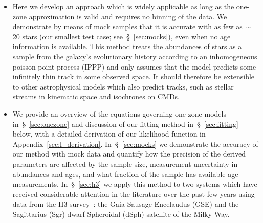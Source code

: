 \documentclass[ms.tex]{subfiles}
\begin{document}
\begin{itemize}
	\item Here we develop an approach which is widely applicable as long as the
	one-zone approximation is valid and requires no binning of the data.
	We demonstrate by means of mock samples that it is accurate with as few
	as~$\sim$20 stars (our smallest test case; see~\S~\ref{sec:mocks}), even
	when no age information is available.
	This method treats the abundances of stars as a sample from the galaxy's
	evolutionary history according to an inhomogeneous poisson point process
	(IPPP) and only assumes that the model predicts some infinitely thin track
	in some observed space.
	It should therefore be extensible to other astrophysical models which also
	predict tracks, such as stellar streams in kinematic space and isochrones
	on CMDs.

	\item We provide an overview of the equations governing one-zone models
	in~\S~\ref{sec:onezone} and discussion of our fitting method
	in~\S~\ref{sec:fitting} below, with a detailed derivation of our
	likelihood function in Appendix~\ref{sec:l_derivation}.
	In~\S~\ref{sec:mocks} we demonstrate the accuracy of our method with mock
	data and quantify how the precision of the derived parameters are affected
	by the sample size, measurement uncertainty in abundances and ages, and
	what fraction of the sample has available age measurements.
	In~\S~\ref{sec:h3} we apply this method to two systems which have received
	considerable attention in the literature over the past few years using data
	from the H3 survey~\citep{Conroy2019}: the Gaia-Sausage Encelaudus (GSE)
	and the Sagittarius (Sgr) dwarf Spheroidal (dSph) satellite of the Milky
	Way.

\end{itemize}
\end{document}
